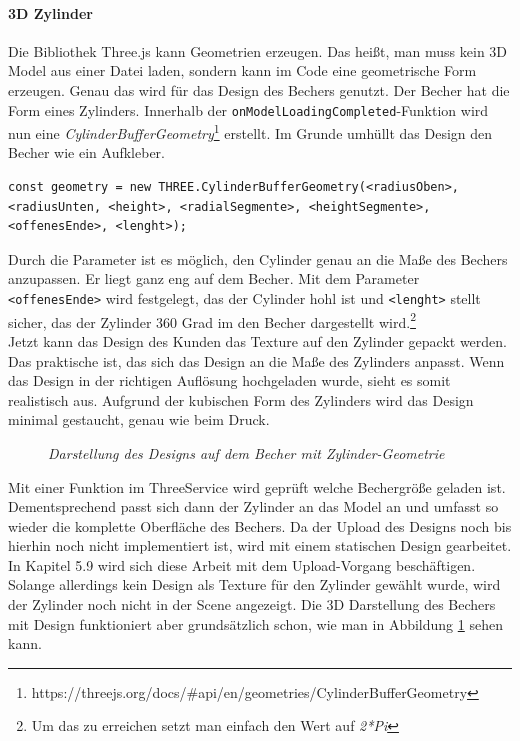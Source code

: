 \paragraph{3D Zylinder}
Die Bibliothek Three.js kann Geometrien erzeugen. Das heißt, man muss kein 3D Model aus einer Datei laden, sondern kann im Code eine geometrische Form erzeugen. Genau das wird für das Design des Bechers genutzt. Der Becher hat die Form eines Zylinders. Innerhalb der \texttt{onModelLoadingCompleted}-Funktion wird nun eine \textit{CylinderBufferGeometry}\footnote{https://threejs.org/docs/\#api/en/geometries/CylinderBufferGeometry} erstellt. Im Grunde umhüllt das Design den Becher wie ein Aufkleber.
%
\begin{lstlisting}
const geometry = new THREE.CylinderBufferGeometry(<radiusOben>, <radiusUnten, <height>, <radialSegmente>, <heightSegmente>, <offenesEnde>, <lenght>);
\end{lstlisting}
%
Durch die Parameter ist es möglich, den Cylinder genau an die Maße des Bechers anzupassen. Er liegt ganz eng auf dem Becher. Mit dem Parameter \texttt{<offenesEnde>} wird festgelegt, das der Cylinder hohl ist und \texttt{<lenght>} stellt sicher, das der Zylinder 360 Grad im den Becher dargestellt wird.\footnote{Um das zu erreichen setzt man einfach den Wert auf \textit{2*Pi }}\\
Jetzt kann das Design des Kunden das Texture auf den Zylinder gepackt werden. Das praktische ist, das sich das Design an die Maße des Zylinders anpasst. Wenn das Design in der richtigen Auflösung hochgeladen wurde, sieht es somit realistisch aus. Aufgrund der kubischen Form des Zylinders wird das Design minimal gestaucht, genau wie beim Druck.
\begin{figure}[h]
	\centering
	{}
	\caption[Konfigurator mit designtem Becher]{\textit{Darstellung des Designs auf dem Becher mit Zylinder-Geometrie}}
	\label{fig:bechermitdesign}
\end{figure}
Mit einer Funktion im ThreeService wird geprüft welche Bechergröße geladen ist. Dementsprechend passt sich dann der Zylinder an das Model an und umfasst so wieder die komplette Oberfläche des Bechers. Da der Upload des Designs noch bis hierhin noch nicht implementiert ist, wird mit einem statischen Design gearbeitet. In Kapitel 5.9 wird sich diese Arbeit mit dem Upload-Vorgang beschäftigen. Solange allerdings kein Design als Texture für den Zylinder gewählt wurde, wird der Zylinder noch nicht in der Scene angezeigt. Die 3D Darstellung des Bechers mit Design funktioniert aber grundsätzlich schon, wie man in Abbildung \ref{fig:bechermitdesign} sehen kann.
%
